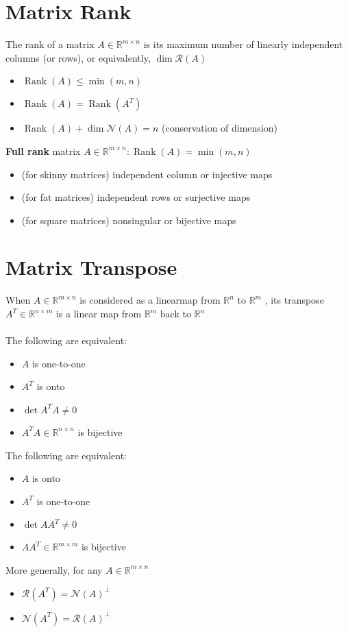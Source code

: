 \documentclass[10pt,a4paper,oneside]{article}
\begin{document}
\section{Matrix Rank}
The rank of a matrix $A \in \mathbb{R}^{m \times n}$ is its maximum number of linearly independent  columns (or rows), or equivalently, $\operatorname{dim} \mathcal{R}(A)$
\begin{itemize}
\item $\operatorname{Rank}(A) \leq \min (m, n)$
\item $\operatorname{Rank}(A)=\operatorname{Rank}\left(A^{T}\right)$
\item $\operatorname{Rank}(A)+\operatorname{dim} \mathcal{N}(A)=n$ (conservation of dimension)
\end{itemize}
{\bfseries Full rank} matrix $A \in \mathbb{R}^{m \times n} : \operatorname{Rank}(A)=\min (m, n)$
\begin{itemize}
\item (for skinny matrices) independent column or injective maps
\item (for fat matrices) independent rows or surjective maps
\item (for square matrices) nonsingular or bijective maps
\end{itemize}
\section{Matrix Transpose}
When $A \in \mathbb{R}^{m \times n}$ is considered as a linearmap from $\mathbb{R}^{n}$ to $\mathbb{R}^{m}$ , its
transpose $A^{T} \in \mathbb{R}^{n \times m}$ is a linear map from $\mathbb{R}^{m}$ back to $\mathbb{R}^{n}$\\
\\The following are equivalent:
\begin{itemize}
\item $A$ is one-to-one
\item $A^{T}$ is onto
\item $\operatorname{det} A^{T} A \neq 0$
\item $A^{T} A \in \mathbb{R}^{n \times n}$ is bijective
\end{itemize}
The following are equivalent:
\begin{itemize}
\item $A$ is onto
\item $A^{T}$ is one-to-one
\item $\operatorname{det} A A^{T} \neq 0$
\item $A A^{T} \in \mathbb{R}^{m \times m}$ is bijective
\end{itemize}
More generally, for any $A\in \mathbb{R}^{m\times n}$
\begin{itemize}
\item $\mathcal{R}\left(A^{T}\right)=\mathcal{N}(A)^{\perp}$
\item $\mathcal{N}\left(A^{T}\right)=\mathcal{R}(A)^{\perp}$
\end{itemize}
\end{document}
